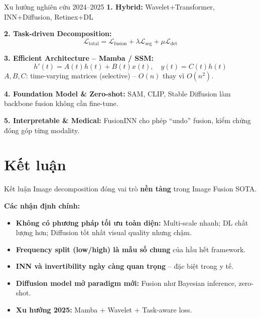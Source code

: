 \documentclass{beamer}
\begin{document}
\begin{frame}{Xu hướng nghiên cứu 2024--2025}
    \small
    \textbf{1. Hybrid:} Wavelet+Transformer, INN+Diffusion, Retinex+DL

    \vspace{0.1cm}
    \textbf{2. Task-driven Decomposition:}
    \vspace{-0.15cm}
    \begin{equation}
        \mathcal{L}_{\text{total}} = \mathcal{L}_{\text{fusion}} + \lambda \mathcal{L}_{\text{seg}} + \mu \mathcal{L}_{\text{det}}
    \end{equation}

    \vspace{-0.15cm}
    \textbf{3. Efficient Architecture -- Mamba / SSM:}
    \vspace{-0.15cm}
    \begin{equation}
        h'(t) = A(t) h(t) + B(t) x(t), \quad y(t) = C(t) h(t)
    \end{equation}
    \vspace{-0.2cm}
    \footnotesize $A, B, C$: time-varying matrices (selective) -- $O(n)$ thay vì $O(n^2)$.

    \small
    \vspace{0.1cm}
    \textbf{4. Foundation Model \& Zero-shot:} SAM, CLIP, Stable Diffusion làm backbone fusion không cần fine-tune.

    \vspace{0.1cm}
    \textbf{5. Interpretable \& Medical:} FusionINN cho phép ``undo'' fusion, kiểm chứng đóng góp từng modality.
\end{frame}

\section{Kết luận}

\begin{frame}{Kết luận}
    \small
    Image decomposition đóng vai trò \textbf{nền tảng} trong Image Fusion SOTA.

    \vspace{0.15cm}
    \textbf{Các nhận định chính:}
    \begin{itemize}\setlength{\itemsep}{3pt}
        \item \textbf{Không có phương pháp tối ưu toàn diện:} Multi-scale nhanh; DL chất lượng hơn; Diffusion tốt nhất visual quality nhưng chậm.
        \item \textbf{Frequency split (low/high) là mẫu số chung} của hầu hết framework.
        \item \textbf{INN và invertibility ngày càng quan trọng} -- đặc biệt trong y tế.
        \item \textbf{Diffusion model mở paradigm mới:} Fusion như Bayesian inference, zero-shot.
        \item \textbf{Xu hướng 2025:} Mamba + Wavelet + Task-aware loss.
    \end{itemize}
\end{frame}
\end{document}
